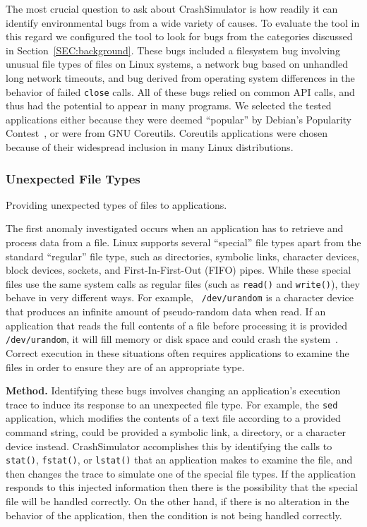 The most crucial question to ask about CrashSimulator is how readily it can
identify environmental bugs from a wide variety of causes.  To evaluate the
tool in this regard we configured the tool to look for bugs from the
categories discussed in Section~\ref{SEC:background}.  These bugs included
a filesystem bug involving unusual file types of files on Linux systems, a
network bug based on unhandled long network timeouts, and bug derived from
operating system differences in the behavior of failed {\tt close} calls.
All of these bugs relied on common API calls, and thus had the potential to
appear in many programs.  We selected the tested applications either
because they were deemed ``popular'' by Debian's Popularity
Contest~\cite{DebPopCon}, or were from GNU Coreutils.  Coreutils
applications were chosen because of their widespread inclusion in many
Linux distributions.

\subsubsection{Unexpected File Types}
\label{sec-file-type-bugs}
Providing unexpected types of files to
applications.

The first anomaly investigated occurs when an application has to retrieve
and process data from a file.  Linux supports several ``special'' file
types apart from the standard ``regular'' file type, such as
directories, symbolic links, character devices, block devices, sockets, and
First-In-First-Out (FIFO) pipes.  While these special files
use the same system calls as regular files (such as {\tt read()} and
{\tt write()}), they behave in very different ways.  For example, {\tt
/dev/urandom} is a character device that produces an infinite amount of
pseudo-random data when read.  If an application that reads the full
contents of a file before processing it is provided {\tt /dev/urandom}, it
will fill memory or disk space and could
crash the system~\cite{YumAptEndless}.
Correct execution in these situations often requires applications
to examine the files in order to ensure they are of an appropriate type.

{\bf Method.}  Identifying these bugs involves changing an application's
execution trace to induce its response to an unexpected file type.  For
example, the {\tt sed} application, which modifies the contents of a text
file according to a provided command string, could be provided a symbolic
link, a directory, or a character device instead.  CrashSimulator
accomplishes this by identifying the calls to {\tt stat()}, {\tt fstat()},
or {\tt lstat()} that an application makes to examine the file, and then
changes the trace to simulate
one of the special file types.  If the application responds to
this injected information then there is the possibility that the special
file will be handled correctly.  On the other hand, if there is no
alteration in the behavior of the application,  then the condition is not
being handled correctly.

